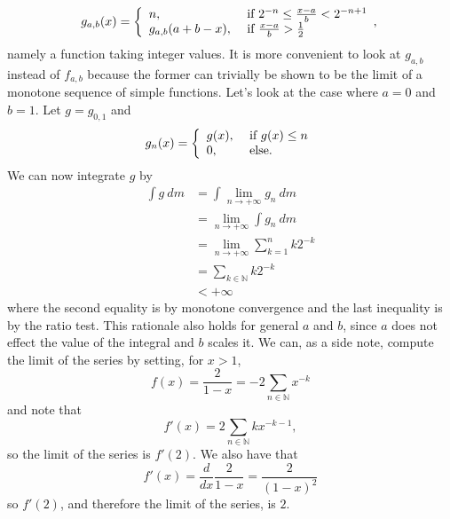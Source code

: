 \documentclass[a4paper,12pt,twoside,BCOR=10mm]{scrbook}
\theoremstyle{definition}
\theoremstyle{definition}
\theoremstyle{definition}
\begin{document}
\[
\label{index31}
	g_{a, b}(x) =
	\left \{
	\begin{array}{l l}
	n, & \text{ if } 2^{-n} \leq \frac{x - a}{b} < 2^{-n + 1}\\
	g_{a, b}(a + b - x) , & \text{ if } \frac{x - a}{b} > \frac{1}{2}
	\end{array},
	\right .
\]
namely a function taking integer values.
It is more convenient to look at $g_{a, b}$ instead of $f_{a, b}$ because the former can trivially be shown to be the limit of a monotone sequence of simple functions.
Let's look at the case where $a = 0$ and $b = 1$.
Let $g = g_{0, 1}$ and
\[
	g_n(x) = \left \{
	\begin{array}{l l}
	g(x), & \text{ if } g(x) \leq n \\
	0, & \text{ else}.
	\end{array}
	\right .
\]
We can now integrate $g$ by
\begin{align*}
	\int g\ dm
	&= \int \lim_{n \rightarrow +\infty} g_n\ dm\\
	&= \lim_{n \rightarrow +\infty} \int g_n\ dm\\
	&= \lim_{n \rightarrow +\infty} \sum_{k = 1}^n k2^{-k}\\
	&= \sum_{k \in \mathbb{N}} k2^{-k}\\
	&< +\infty
\end{align*}
where the second equality is by monotone convergence and the last inequality is by the ratio test.
This rationale also holds for general $a$ and $b$, since $a$ does not effect the value of the integral and $b$ scales it.
We can, as a side note, compute the limit of the series by setting, for $x > 1$,
\[
	f(x) = \frac{2}{1 - x} = -2\sum_{n \in \mathbb{N}} x^{-k}
\]
and note that
\[
	f'(x) = 2\sum_{n \in \mathbb{N}} kx^{-k - 1},
\]
so the limit of the series is $f'(2)$.
We also have that
\[
	f'(x) = \frac{d}{dx}\frac{2}{1 - x} = \frac{2}{(1 - x)^2}
\]
so $f'(2)$, and therefore the limit of the series, is $2$.
\end{document}
